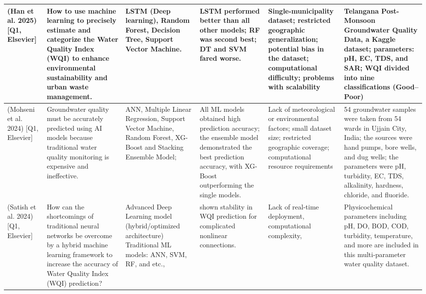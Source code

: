 \documentclass[conference]{IEEEtran}
\begin{document}
\begin{table}[htb!]
\begin{tabular} [htb]{|p{1.6cm}|p{3.1cm}|p{2.7cm}|p{3.1cm}|p{2.5cm}|p{2.6cm}|}
\hline 

(Han et al. 2025)\cite{han2025predicting} [Q1, Elsevier]
& How to use machine learning to precisely estimate and categorize the Water Quality Index (WQI) to enhance environmental sustainability and urban waste management. & LSTM (Deep learning), Random Forest, Decision Tree, Support Vector Machine. & LSTM performed better than all other models;  RF was second best; DT and SVM fared worse. & Single-municipality dataset; restricted geographic generalization; potential bias in the dataset; computational difficulty; problems with scalability  & Telangana Post-Monsoon Groundwater Quality Data, a Kaggle dataset; parameters: pH, EC, TDS, and SAR; WQI divided into nine classifications (Good–Poor) \\

\hline

(Mohseni et al. 2024)\cite{mohseni2024prediction} [Q1, Elsevier] & 

Groundwater quality must be accurately predicted using AI models because traditional water quality monitoring is expensive and ineffective. & 
ANN, Multiple Linear Regression, Support Vector Machine, Random Forest, XG-Boost and Stacking Ensemble Model; & All ML models obtained high prediction accuracy; the ensemble model demonstrated the best prediction accuracy, with XG-Boost outperforming the single models. & Lack of meteorological or environmental factors; small dataset size; restricted geographic coverage; computational resource requirements & 54 groundwater samples were taken from 54 wards in Ujjain City, India; the sources were hand pumps, bore wells, and dug wells; the parameters were pH, turbidity, EC, TDS, alkalinity, hardness, chloride, and fluoride.\\

\hline

(Satish et al. 2024)\cite{satish2024performance} [Q1, Elsevier] & How can the shortcomings of traditional neural networks be overcome by a hybrid machine learning framework to increase the accuracy of Water Quality Index (WQI) prediction? & Advanced Deep Learning model (hybrid/optimized architecture)
Traditional ML models: ANN, SVM, RF, and etc., & shown stability in WQI prediction for complicated nonlinear connections. & Lack of real-time deployment, computational complexity,  &  Physicochemical parameters including pH, DO, BOD, COD, turbidity, temperature, and more are included in this multi-parameter water quality dataset.  \\
\hline



\end{tabular}
\end{table}
\end{document}
